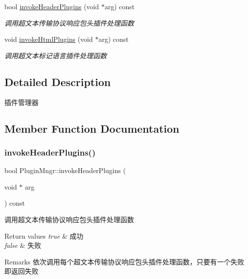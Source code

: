 \begin{DoxyCompactItemize}
bool \hyperlink{class_plugin_mngr_ac3d8362f2197873631b3e4893e40dfcd}{invoke\+Header\+Plugins} (void $\ast$arg) const
\begin{DoxyCompactList}\small\item\em 调用超文本传输协议响应包头插件处理函数 \end{DoxyCompactList}\item 
void \hyperlink{class_plugin_mngr_ab1279ac48a5c4088b4caf61047d2574b}{invoke\+Html\+Plugins} (void $\ast$arg) const
\begin{DoxyCompactList}\small\item\em 调用超文本标记语言插件处理函数 \end{DoxyCompactList}\end{DoxyCompactItemize}


\subsection{Detailed Description}
插件管理器 

\subsection{Member Function Documentation}
\mbox{\label{class_plugin_mngr_ac3d8362f2197873631b3e4893e40dfcd}} 
\subsubsection{\texorpdfstring{invoke\+Header\+Plugins()}{invokeHeaderPlugins()}}
{\footnotesize\ttfamily bool Plugin\+Mngr\+::invoke\+Header\+Plugins (\begin{DoxyParamCaption}\item[{void $\ast$}]{arg }\end{DoxyParamCaption}) const}



调用超文本传输协议响应包头插件处理函数 


\begin{DoxyRetVals}{Return values}
{\em true} & 成功 \\
\hline
{\em false} & 失败 \\
\hline
\end{DoxyRetVals}
\begin{DoxyRemark}{Remarks}
依次调用每个超文本传输协议响应包头插件处理函数，只要有一个失败即返回失败 
\end{DoxyRemark}

